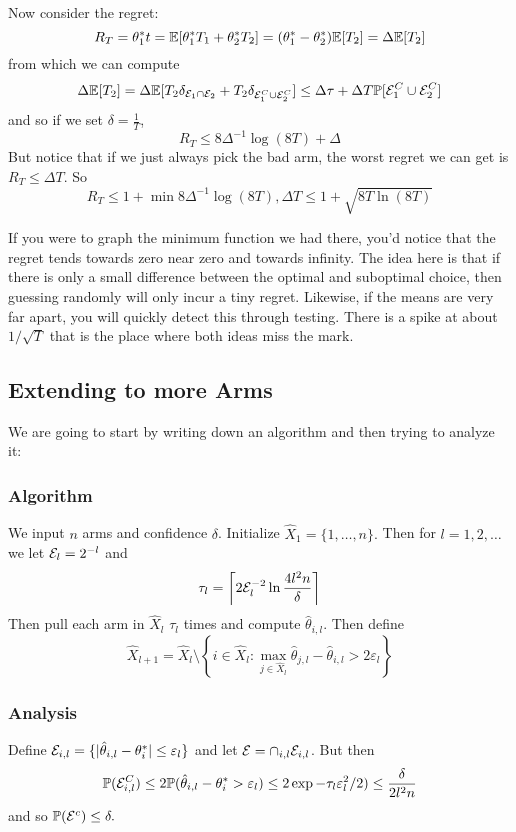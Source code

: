\documentclass[12pt]{article}
\begin{document}
Now consider the regret:
\[R_T=\theta_1^\ast t=\mathbb{E}[\theta_1^\ast T_1+\theta_2^\ast T_2]=(\theta_1^\ast-\theta_2^\ast)\mathbb{E}[T_2]=\Delta\mathbb{E}[T_2]\]
from which we can compute 
\[\Delta\mathbb{E}[T_2]=\Delta\mathbb{E}[T_2\delta_{\mathcal{E}_1\cap\mathcal{E}_2}+T_2\delta_{\mathcal{E}_1^C\cup \mathcal{E}_2^C}]\le\Delta\tau+\Delta T\mathbb{P}[\mathcal{E}_1^C\cup\mathcal{E}_2^C]\]
and so if we set $\delta=\frac{1}{T}$,
\[R_T\le 8\Delta^{-1}\log(8T)+\Delta\]
But notice that if we just always pick the bad arm, the worst regret we can get is $R_T\le \Delta T$. So 
\[R_T\le1+\min{8\Delta^{-1}\log(8T),\Delta T}\le 1+\sqrt{8T\ln(8T)}\]

If you were to graph the minimum function we had there, you'd notice that the regret tends towards zero near zero and towards infinity. The idea here is that if there is only a small difference between the optimal and suboptimal choice, 
then guessing randomly will only incur a tiny regret. Likewise, if the means are very far apart, you will quickly detect this through testing. There is a spike at about $1/\sqrt{T}$ that is the place where both ideas miss the mark.

\subsection{Extending to more Arms}
We are going to start by writing down an algorithm and then trying to analyze it:

\subsubsection{Algorithm}
We input $n$ arms and confidence $\delta$. Initialize $\hat X_1=\{1,\dots,n\}.$ Then for $l=1,2,\dots$ we let $\mathcal{E}_l=2^{-l}$ and 
\[\tau_l=\left\lceil 2\mathcal{E}_l^{-2}\ln\frac{4 l^2 n}{\delta}\right\rceil\]
Then pull each arm in $\hat X_l$ $\tau_l$ times and compute $\hat\theta_{i,l}$. Then define 
\[\hat X_{l+1}=\hat X_l\setminus\left\{i\in \hat X_l:\max_{j\in\hat X_l}\hat\theta_{j,l}-\hat\theta_{i,l}>2\varepsilon_l\right\}\]

\subsubsection{Analysis}
Define $\mathcal{E}_{i,l}=\{|\hat\theta_{i,l}-\theta_i^\ast|\le\varepsilon_l\}$ and let $\mathcal{E}=\cap_{i,l}\mathcal{E}_{i,l}$. But then 
\[\mathbb{P}(\mathcal{E}_{i,l}^C)\le 2\mathbb{P}(\hat\theta_{i,l}-\theta_i^\ast>\varepsilon_l)\le 2\exp{-\tau_l\varepsilon^2_l/2)}\le\frac{\delta}{2l^2n}\]
and so $\mathbb{P}(\mathcal{E}^c)\le\delta.$
\end{document}

